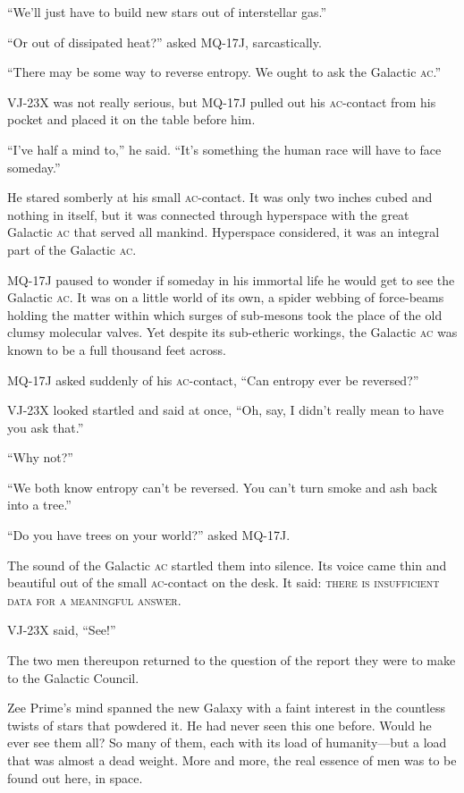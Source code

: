 \enquote{We'll just have to build new stars out of interstellar gas.}

\enquote{Or out of dissipated heat?} asked MQ-17J, sarcastically.

\enquote{There may be some way to reverse entropy. We ought to ask the Galactic \textsc{ac}.}

VJ-23X was not really serious, but MQ-17J pulled out his \textsc{ac}-contact from his pocket and placed it on the table before him.

\enquote{I've half a mind to,} he said. \enquote{It's something the human race will have to face someday.}

He stared somberly at his small \textsc{ac}-contact. It was only two inches cubed and nothing in itself, but it was connected through hyperspace with the great Galactic \textsc{ac} that served all mankind. Hyperspace considered, it was an integral part of the Galactic \textsc{ac}.

MQ-17J paused to wonder if someday in his immortal life he would get to see the Galactic \textsc{ac}. It was on a little world of its own, a spider webbing of force-beams holding the matter within which surges of sub-mesons took the place of the old clumsy molecular valves. Yet despite its sub-etheric workings, the Galactic \textsc{ac} was known to be a full thousand feet across.

MQ-17J asked suddenly of his \textsc{ac}-contact, \enquote{Can entropy ever be reversed?}

VJ-23X looked startled and said at once, \enquote{Oh, say, I didn't really mean to have you ask that.}

\enquote{Why not?}

\enquote{We both know entropy can't be reversed. You can't turn smoke and ash back into a tree.}

\enquote{Do you have trees on your world?} asked MQ-17J.

The sound of the Galactic \textsc{ac} startled them into silence. Its voice came thin and beautiful out of the small \textsc{ac}-contact on the desk. It said: \textsc{there is insufficient data for a meaningful answer}.

VJ-23X said, \enquote{See!}

The two men thereupon returned to the question of the report they were to make to the Galactic Council.

\medskip

Zee Prime's mind spanned the new Galaxy with a faint interest in the countless twists of stars that powdered it. He had never seen this one before. Would he ever see them all? So many of them, each with its load of humanity---but a load that was almost a dead weight. More and more, the real essence of men was to be found out here, in space.


